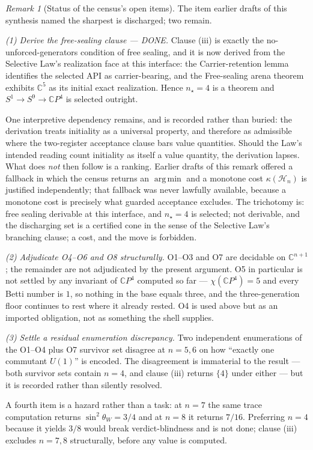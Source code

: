 \documentclass[11pt]{article}
\theoremstyle{plain}
\theoremstyle{definition}
\theoremstyle{remark}
\newtheorem{remark}[theorem]{Remark}
\newcommand{\argmin}{\operatorname*{arg\,min}}
\newcommand{\C}{\mathbb{C}}
\begin{document}
\begin{remark}[Status of the census's open items]
The item earlier drafts of this synthesis named the sharpest is discharged; two remain.

\emph{(1) Derive the free-sealing clause --- \textnormal{DONE}.} Clause (iii) is exactly the no-unforced-generators condition of free sealing, and it is now derived from the Selective Law's realization face at this interface: the Carrier-retention lemma identifies the selected API as carrier-bearing, and the Free-sealing arena theorem exhibits \(\C^5\) as its initial exact realization. Hence \(n_\star=4\) is a theorem and \(S^1\to S^9\to\C P^4\) is selected outright.

One interpretive dependency remains, and is recorded rather than buried: the derivation treats initiality as a universal property, and therefore as admissible where the two-register acceptance clause bars value quantities. Should the Law's intended reading count initiality as itself a value quantity, the derivation lapses. What does \emph{not} then follow is a ranking. Earlier drafts of this remark offered a fallback in which the census returns an \(\argmin\) and a monotone cost \(\kappa(\mathcal H_n)\) is justified independently; that fallback was never lawfully available, because a monotone cost is precisely what guarded acceptance excludes. The trichotomy is: free sealing derivable at this interface, and \(n_\star=4\) is selected; not derivable, and the discharging set is a certified cone in the sense of the Selective Law's branching clause; a cost, and the move is forbidden.

\emph{(2) Adjudicate O4--O6 and O8 structurally.} O1--O3 and O7 are decidable on \(\C^{n+1}\); the remainder are not adjudicated by the present argument. O5 in particular is not settled by any invariant of \(\C P^4\) computed so far --- \(\chi(\C P^4)=5\) and every Betti number is \(1\), so nothing in the base equals three, and the three-generation floor continues to rest where it already rested. O4 is used above but as an imported obligation, not as something the shell supplies.

\emph{(3) Settle a residual enumeration discrepancy.} Two independent enumerations of the O1--O4 plus O7 survivor set disagree at \(n=5,6\) on how ``exactly one commutant \(U(1)\)'' is encoded. The disagreement is immaterial to the result --- both survivor sets contain \(n=4\), and clause (iii) returns \(\{4\}\) under either --- but it is recorded rather than silently resolved.

A fourth item is a hazard rather than a task: at \(n=7\) the same trace computation returns \(\sin^2\theta_W=3/4\) and at \(n=8\) it returns \(7/16\). Preferring \(n=4\) because it yields \(3/8\) would break verdict-blindness and is not done; clause (iii) excludes \(n=7,8\) structurally, before any value is computed.
\end{remark}
\end{document}
